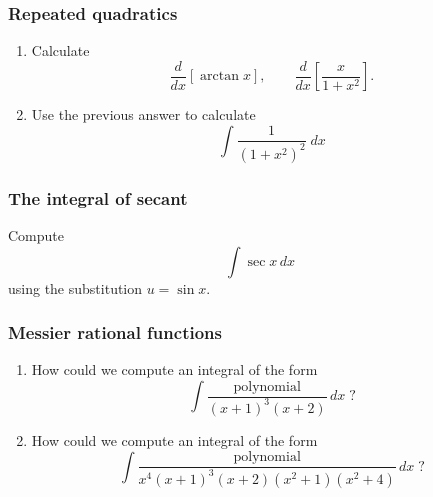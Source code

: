 \documentclass[14pt]{beamer}
\begin{document}
	\begin{frame}[t]
		\frametitle{Repeated quadratics}

		\begin{enumerate}
			\item Calculate
				\[
					\frac{d}{dx}\left[ \arctan x \right], \quad \quad \frac{d}{dx}\left[ \frac{x}{1+x^{2}}
					\right].
				\]

			\item Use the previous answer to calculate
				\[
					\int \frac{1}{\left(1+x^{2}\right)^{2}}\; dx
				\]
		\end{enumerate}
	\end{frame}

	\begin{frame}[t]
		\frametitle{The integral of secant}

		Compute
		\[
			\int \sec x \, dx
		\]
		using the substitution $\displaystyle u = \sin x$.
	\end{frame}

	\begin{frame}[t]
		\frametitle{Messier rational functions}

		\begin{enumerate}
			\item How could we compute an integral of the form
				\[
					\int \frac{\text{polynomial}}{(x+1)^{3}(x+2)}\, dx \; ?
				\]

			\item How could we compute an integral of the form
				\[
					\int \frac{\text{polynomial}}{x^{4}(x+1)^{3}(x+2)(x^{2}+1)(x^{2}+4)}\,d
					x \; ?
				\]
		\end{enumerate}
	\end{frame}


\end{document}
